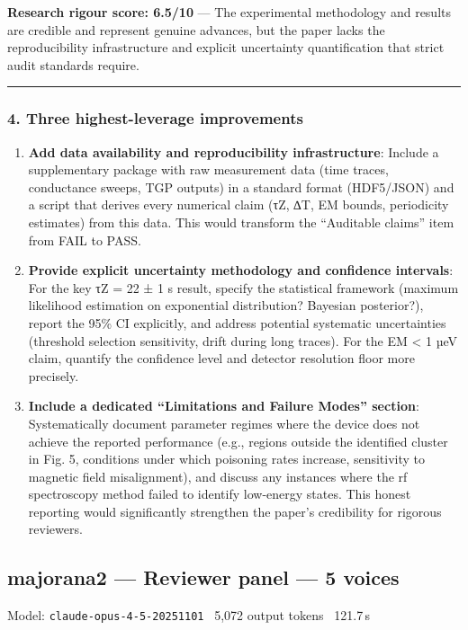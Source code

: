 \documentclass[10pt,letterpaper]{article}
\begin{document}
\textbf{Research rigour score: 6.5/10} --- The experimental methodology and results are credible and represent genuine advances, but the paper lacks the reproducibility infrastructure and explicit uncertainty quantification that strict audit standards require.

\begin{center}\rule{0.5\linewidth}{0.5pt}\end{center}

\hypertarget{three-highest-leverage-improvements}{%
\subsubsection{4. Three highest-leverage improvements}\label{three-highest-leverage-improvements}}

\begin{enumerate}
\def\labelenumi{\arabic{enumi}.}
\item
  \textbf{Add data availability and reproducibility infrastructure}: Include a supplementary package with raw measurement data (time traces, conductance sweeps, TGP outputs) in a standard format (HDF5/JSON) and a script that derives every numerical claim (τZ, ∆T, EM bounds, periodicity estimates) from this data. This would transform the ``Auditable claims'' item from FAIL to PASS.
\item
  \textbf{Provide explicit uncertainty methodology and confidence intervals}: For the key τZ = 22 ± 1 s result, specify the statistical framework (maximum likelihood estimation on exponential distribution? Bayesian posterior?), report the 95\% CI explicitly, and address potential systematic uncertainties (threshold selection sensitivity, drift during long traces). For the EM \textless{} 1 µeV claim, quantify the confidence level and detector resolution floor more precisely.
\item
  \textbf{Include a dedicated ``Limitations and Failure Modes'' section}: Systematically document parameter regimes where the device does not achieve the reported performance (e.g., regions outside the identified cluster in Fig. 5, conditions under which poisoning rates increase, sensitivity to magnetic field misalignment), and discuss any instances where the rf spectroscopy method failed to identify low-energy states. This honest reporting would significantly strengthen the paper's credibility for rigorous reviewers.
\end{enumerate}


\subsection{majorana2 --- Reviewer panel — 5 voices}
\noindent\textcolor{muted}{\small Model: \texttt{claude-opus-4-5-20251101} \textperiodcentered\ 5,072 output tokens \textperiodcentered\ 121.7\,s}
\end{document}
